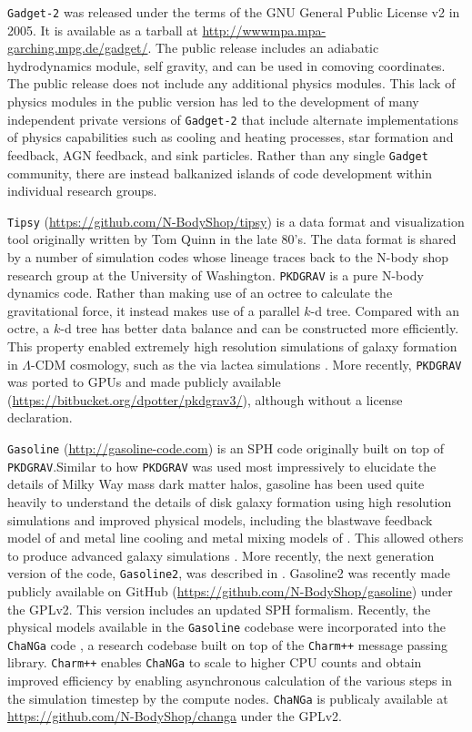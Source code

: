\documentclass[11pt,twoside]{article}
\begin{document}
\texttt{Gadget-2} was released under the terms of the GNU General Public License v2 in 2005. It is available as a tarball at \url{http://wwwmpa.mpa-garching.mpg.de/gadget/}. The public release includes an adiabatic hydrodynamics module, self gravity, and can be used in comoving coordinates. The public release does not include any additional physics modules. This lack of physics modules in the public version has led to the development of many independent private versions of \texttt{Gadget-2} that include alternate implementations of physics capabilities such as cooling and heating processes, star formation and feedback, AGN feedback, and sink particles. Rather than any single \texttt{Gadget} community, there are instead balkanized islands of code development within individual research groups.

\texttt{Tipsy} (\url{https://github.com/N-BodyShop/tipsy}) is a data format and visualization tool originally written by Tom Quinn in the late 80's. The data format is shared by a number of simulation codes whose lineage traces back to the N-body shop research group at the University of Washington. \texttt{PKDGRAV} \citep{stadel2001} is a pure N-body dynamics code. Rather than making use of an octree to calculate the gravitational force, it instead makes use of a parallel $k$-d tree. Compared with an octre, a $k$-d tree has better data balance and can be constructed more efficiently. This property enabled extremely high resolution simulations of galaxy formation in $\Lambda$-CDM cosmology, such as the via lactea simulations \citep{diemand2008}. More recently, \texttt{PKDGRAV} was ported to GPUs \citep{potter2017} and made publicly available (\url{https://bitbucket.org/dpotter/pkdgrav3/}), although without a license declaration.

\texttt{Gasoline} \citep{wadsley2004} (\url{http://gasoline-code.com}) is an SPH code originally built on top of \texttt{PKDGRAV}.\@ Similar to how \texttt{PKDGRAV} was used most impressively to elucidate the details of Milky Way mass dark matter halos, gasoline has been used quite heavily to understand the details of disk galaxy formation using high resolution simulations and improved physical models, including the blastwave feedback model of \citet{stinson2006} and metal line cooling and metal mixing models of \citet{shen2010}. This allowed others to produce advanced galaxy simulations \citep{guedes2011, pontzen2012, zolotov2012}. More recently, the next generation version of the code, \texttt{Gasoline2}, was described in \citet{wadsley2017}. Gasoline2 was recently made publicly available on GitHub (\url{https://github.com/N-BodyShop/gasoline}) under the GPLv2. This version includes an updated SPH formalism. Recently, the physical models available in the \texttt{Gasoline} codebase were incorporated into the \texttt{ChaNGa} code \citep{jetley2008}, a research codebase built on top of the \texttt{Charm++} message passing library. \texttt{Charm++} enables \texttt{ChaNGa} to scale to higher CPU counts and obtain improved efficiency by enabling asynchronous calculation of the various steps in the simulation timestep by the compute nodes. \texttt{ChaNGa} is publicaly available at \url{https://github.com/N-BodyShop/changa} under the GPLv2.
\end{document}
